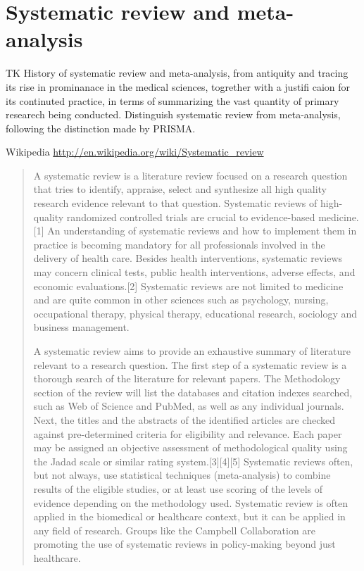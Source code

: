 \section{Systematic review and meta-analysis}
TK History of systematic review and meta-analysis, from antiquity and
tracing its rise in prominanace in the medical sciences, togrether
with a justifi caion for its continuted practice, in terms of
summarizing the vast quantity of primary researech being
conducted. Distinguish systematic review from meta-analysis, following
the distinction made by PRISMA.

Wikipedia \url{http://en.wikipedia.org/wiki/Systematic_review}
\begin{quote} A systematic review is a literature review
  focused on a research question that tries to identify, appraise,
  select and synthesize all high quality research evidence relevant to
  that question. Systematic reviews of high-quality randomized
  controlled trials are crucial to evidence-based medicine.[1] An
  understanding of systematic reviews and how to implement them in
  practice is becoming mandatory for all professionals involved in the
  delivery of health care. Besides health interventions, systematic
  reviews may concern clinical tests, public health interventions,
  adverse effects, and economic evaluations.[2] Systematic reviews are
  not limited to medicine and are quite common in other sciences such
  as psychology, nursing, occupational therapy, physical therapy,
  educational research, sociology and business management.

A systematic review aims to provide an exhaustive summary of
literature relevant to a research question. The first step of a
systematic review is a thorough search of the literature for relevant
papers. The Methodology section of the review will list the databases
and citation indexes searched, such as Web of Science and PubMed, as
well as any individual journals. Next, the titles and the abstracts of
the identified articles are checked against pre-determined criteria
for eligibility and relevance. Each paper may be assigned an objective
assessment of methodological quality using the Jadad scale or similar
rating system.[3][4][5] Systematic reviews often, but not always, use
statistical techniques (meta-analysis) to combine results of the
eligible studies, or at least use scoring of the levels of evidence
depending on the methodology used. Systematic review is often applied
in the biomedical or healthcare context, but it can be applied in any
field of research. Groups like the Campbell Collaboration are
promoting the use of systematic reviews in policy-making beyond just
healthcare.


\end{quote}
